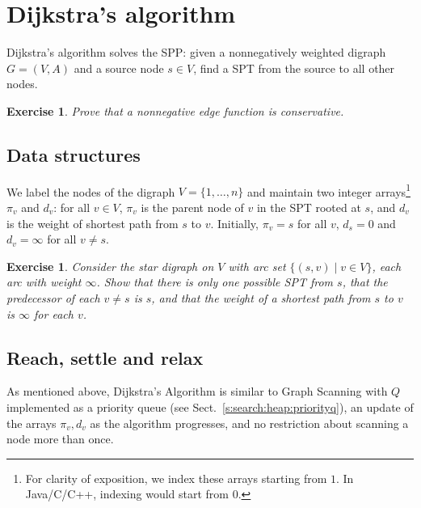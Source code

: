 \documentclass[a4paper]{book}
\theoremstyle{changebreak}                %
\newtheorem{ex}[result]{Exercise}
\begin{document}
\section{Dijkstra's algorithm}
\label{s:path:dijkstra}
Dijkstra's algorithm solves the SPP: given a nonnegatively
weighted digraph $G=(V,A)$ and a
source node $s\in V$, find a SPT from
the source to all other nodes.

\begin{ex}
Prove that a nonnegative edge function is
conservative.
\end{ex}

\subsection{Data structures}
We label the nodes of the digraph $V=\{1,\ldots,n\}$
and maintain two integer arrays\footnote{For clarity of exposition, we
  index these arrays starting from $1$. In Java/C/C++, indexing would
  start from $0$.} $\pi_v$ and $d_v$: for all
$v\in V$, $\pi_v$ is the parent node of $v$ in the
SPT rooted at $s$, and $d_v$ is the weight of shortest
path from $s$ to $v$. Initially, $\pi_v=s$
for all $v$, $d_s=0$ and $d_v=\infty$ for all $v\not=s$.

\begin{ex}
Consider the star digraph on $V$ with arc set
$\{(s,v)\;|\;v\in V\}$, each arc with weight $\infty$. Show that there
is only one possible SPT from $s$, that the predecessor of each
$v\not=s$ is $s$, and that the weight of a shortest path from $s$ to
$v$ is $\infty$ for each $v$. 
\end{ex}

\subsection{Reach, settle and relax}
As mentioned above, {\sc Dijkstra's
  Algorithm} is similar to {\sc Graph
  Scanning} with $Q$
implemented as a priority queue (see
Sect.~\ref{s:search:heap:priorityq}), an update of the arrays
$\pi_v,d_v$ as the algorithm progresses, and no restriction about
scanning a node more than once.
\end{document}
